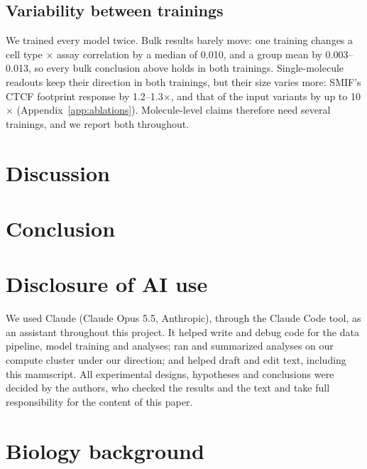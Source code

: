 \documentclass[acmtog,nonacm]{acmart}   %
\begin{document}
\subsection{Variability between trainings}
\label{sec:res-seeds}

We trained every model twice. Bulk results barely move: one training changes a cell type $\times$ assay correlation
by a median of 0.010, and a group mean by 0.003--0.013, so every bulk conclusion above holds in both trainings.
Single-molecule readouts keep their direction in both trainings, but their size varies more: SMIF's CTCF footprint
response by 1.2--1.3$\times$, and that of the input variants by up to 10$\times$ (Appendix~\ref{app:ablations}).
Molecule-level claims therefore need several trainings, and we report both throughout.

\section{Discussion}
\label{sec:discussion}

\section{Conclusion}
\label{sec:conclusion}

\section*{Disclosure of AI use}
We used Claude (Claude Opus 5.5, Anthropic), through the Claude Code tool, as an assistant throughout this project.
It helped write and debug code for the data pipeline, model training and analyses; ran and summarized analyses on
our compute cluster under our direction; and helped draft and edit text, including this manuscript. All
experimental designs, hypotheses and conclusions were decided by the authors, who checked the results and the text
and take full responsibility for the content of this paper.




\appendix
\section{Biology background}
\label{app:bio}
\end{document}
